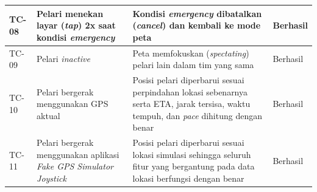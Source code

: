 \begin{longtable}{|p{1.2cm}|p{4.5cm}|p{5cm}|p{2cm}|}
TC-08 & Pelari menekan layar (\textit{tap}) 2x saat kondisi \textit{emergency} & Kondisi \textit{emergency} dibatalkan (\textit{cancel}) dan kembali ke mode peta & Berhasil \\ \hline

TC-09 & Pelari \textit{inactive} & Peta memfokuskan (\textit{spectating}) pelari lain dalam tim yang sama & Berhasil \\ \hline

TC-10 & Pelari bergerak menggunakan GPS aktual & Posisi pelari diperbarui sesuai perpindahan lokasi sebenarnya serta ETA, jarak tersisa, waktu tempuh, dan \textit{pace} dihitung dengan benar & Berhasil \\ \hline

TC-11 & Pelari bergerak menggunakan aplikasi \textit{Fake GPS Simulator Joystick} & Posisi pelari diperbarui sesuai lokasi simulasi sehingga seluruh fitur yang bergantung pada data lokasi berfungsi dengan benar & Berhasil \\ \hline

\end{longtable}